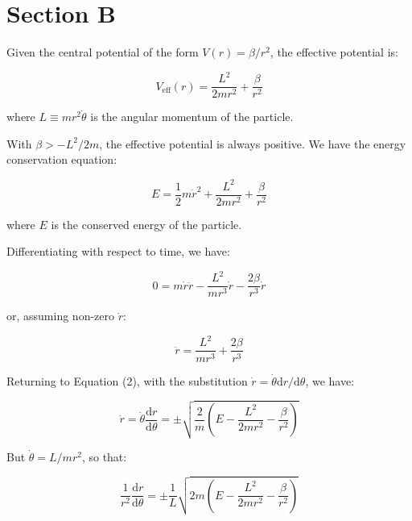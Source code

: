 \documentclass[12pt]{article}
\begin{document}
\pagebreak
\section*{Section B}



Given the central potential of the form $V(r) = \beta/r^{2}$, the effective potential is:

\begin{equation}
    V_{\text{eff}}(r) = \frac{L^{2}}{2mr^{2}} + \frac{\beta}{r^{2}}
\end{equation}

where $L \equiv mr^{2}\dot{\theta}$ is the angular momentum of the particle.

With $\beta > -L^{2}/2m$, the effective potential is always positive. We have the energy conservation equation:

\begin{equation}
    E = \frac{1}{2} m \dot{r}^{2} + \frac{L^{2}}{2mr^{2}} + \frac{\beta}{r^{2}}
\end{equation}

where $E$ is the conserved energy of the particle.

Differentiating with respect to time, we have:

\begin{equation}
    0 = m \dot{r} \ddot{r} - \frac{L^{2}}{mr^{3}} \dot{r} - \frac{2\beta}{r^{3}} \dot{r}
\end{equation}

or, assuming non-zero $\dot{r}$:

\begin{equation}
    \ddot{r} = \frac{L^{2}}{mr^{3}} + \frac{2\beta}{r^{3}}
\end{equation}

Returning to Equation (2), with the substitution $\dot{r} = \dot{\theta} \mathrm{d}r/\mathrm{d}\theta$, we have:

\begin{equation}
    \dot{r} = \dot{\theta} \frac{\mathrm{d}r}{\mathrm{d}\theta} = \pm\sqrt{\frac{2}{m} \left( E - \frac{L^{2}}{2mr^{2}} - \frac{\beta}{r^{2}} \right)}
\end{equation}

But $\dot{\theta} = L/mr^{2}$, so that:

\begin{equation}
    \frac{1}{r^{2}} \frac{\mathrm{d}r}{\mathrm{d}\theta} = \pm\frac{1}{L} \sqrt{2m \left( E - \frac{L^{2}}{2mr^{2}} - \frac{\beta}{r^{2}} \right)}
\end{equation}
\end{document}
